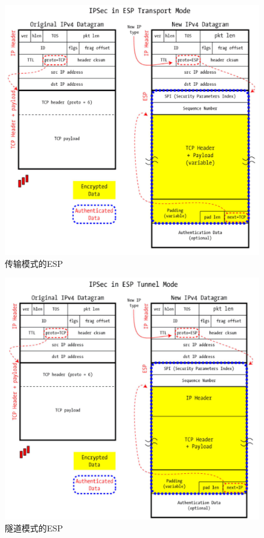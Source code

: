 \documentclass{ctexart}
\begin{document}
    \begin{figure}[ht!]
    \centering
    \includegraphics[width=1.0\textwidth]{esp-transport.png}
    \caption{传输模式的ESP}
    \label{esp-transport}
    \end{figure}

    \begin{figure}[ht!]
    \centering
    \includegraphics[width=1.0\textwidth]{esp-tunnel.png}
    \caption{隧道模式的ESP}
    \label{esp-tunnel}
    \end{figure}
\clearpage
\end{document}
